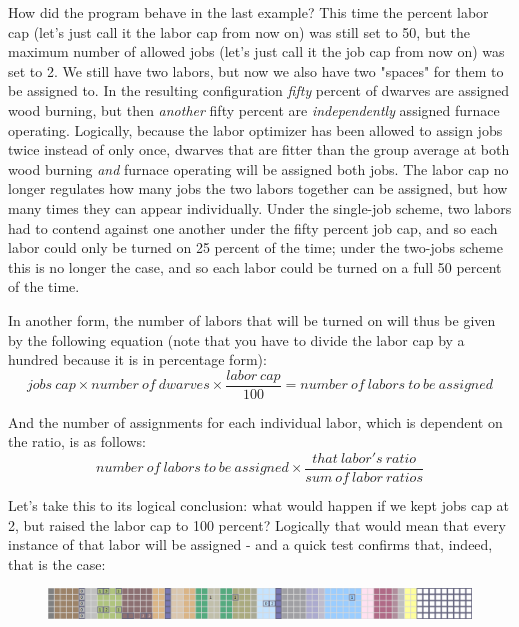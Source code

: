 \documentclass[]{article}
\begin{document}
How did the program behave in the last example? This time the percent labor cap (let's just call it the
labor cap from now on) was still set to 50, but the maximum number of allowed jobs (let's just call it
the job cap from now on) was set to 2. We still have two labors, but now we also have two "spaces" for
them to be assigned to. In the resulting configuration \emph{fifty} percent of dwarves are assigned wood
burning, but then \emph{another} fifty percent are \emph{independently} assigned furnace operating.
Logically, because the labor optimizer has been allowed to assign jobs twice instead of only once,
dwarves that are fitter than the group average at both wood burning \emph{and} furnace operating will be
assigned both jobs. The labor cap no longer regulates how many jobs the two labors together can be
assigned, but how many times they can appear individually. Under the single-job scheme, two labors had to
contend against one another under the fifty percent job cap, and so each labor could only be turned on 25
percent of the time; under the two-jobs scheme this is no longer the case, and so each labor could be
turned on a full 50 percent of the time.

In another form, the number of labors that will be turned on will thus be given by the following equation
(note that you have to divide the labor cap by a hundred because it is in percentage form):
\begin{displaymath}
jobs\:cap \times number\:of\:dwarves \times  \frac{labor\:cap}{100} = number\:of\:labors\:to\:be\:assigned
\end{displaymath}

And the number of assignments for each individual labor, which is dependent on the ratio, is as follows:
\begin{displaymath}
number\:of\:labors\:to\:be\:assigned \times \frac{that\:labor's\:ratio}{sum\:of\:labor\:ratios}
\end{displaymath}

Let's take this to its logical conclusion: what would happen if we kept jobs cap at 2, but raised the
labor cap to 100 percent? Logically that would mean that every instance of that labor will be assigned -
and a quick test confirms that, indeed, that is the case:
\begin{figure}[h!] \centering
\includegraphics[width=\linewidth]{Sec4Fig13}
\end{figure}
\end{document}
